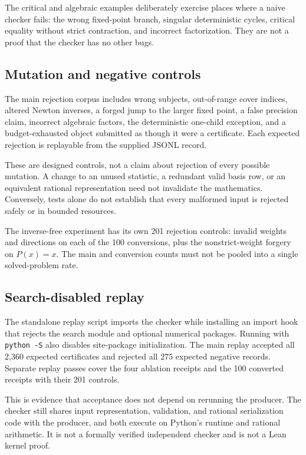 \documentclass[11pt,a4paper]{article}
\theoremstyle{definition}\newtheorem{definition}[theorem]{Definition}
\theoremstyle{remark}\newtheorem{remark}[theorem]{Remark}
\newcommand{\code}[1]{\nolinkurl{#1}}
\begin{document}
The critical and algebraic examples deliberately exercise places where a naive checker fails: the wrong fixed-point branch, singular deterministic cycles, critical equality without strict contraction, and incorrect factorization. They are not a proof that the checker has no other bugs.

\subsection{Mutation and negative controls}
The main rejection corpus includes wrong subjects, out-of-range cover indices, altered Newton inverses, a forged jump to the larger fixed point, a false precision claim, incorrect algebraic factors, the deterministic one-child exception, and a budget-exhausted object submitted as though it were a certificate. Each expected rejection is replayable from the supplied JSONL record.

These are designed controls, not a claim about rejection of every possible mutation. A change to an unused statistic, a redundant valid basis row, or an equivalent rational representation need not invalidate the mathematics. Conversely, tests alone do not establish that every malformed input is rejected safely or in bounded resources.

The inverse-free experiment has its own 201 rejection controls: invalid weights and directions on each of the 100 conversions, plus the nonstrict-weight forgery on $P(x)=x$. The main and conversion counts must not be pooled into a single solved-problem rate.

\subsection{Search-disabled replay}
The standalone replay script imports the checker while installing an import hook that rejects the search module and optional numerical packages. Running with \code{python -S} also disables site-package initialization. The main replay accepted all 2,360 expected certificates and rejected all 275 expected negative records. Separate replay passes cover the four ablation receipts and the 100 converted receipts with their 201 controls.

This is evidence that acceptance does not depend on rerunning the producer. The checker still shares input representation, validation, and rational serialization code with the producer, and both execute on Python's runtime and rational arithmetic. It is not a formally verified independent checker and is not a Lean kernel proof.
\end{document}
